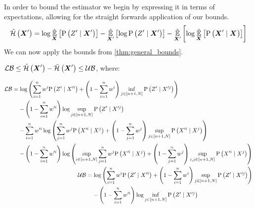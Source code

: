 In order to bound the estimator we begin by expressing it in terms of expectations, allowing for the straight forwards application of our bounds.
\begin{equation}
		\hat{\mathcal{H}}\left({\boldsymbol X_{}^\prime}\right)=\log\operatorname*{\hat{\operatorname*{\mathbb{E}}}}\limits_{\boldsymbol X_{}}\left[{\mathrm{P}\left({Z_{}^\prime}\mid{\ensuremath{\boldsymbol X_{}}^\prime}\right)}\right]-\operatorname*{\hat{\operatorname*{\mathbb{E}}}}\limits_{\boldsymbol X_{}^\prime}\left[{\log\mathrm{P}\left({Z_{}^\prime}\mid{\ensuremath{\boldsymbol X_{}}^\prime}\right)}\right]-\operatorname*{\hat{\operatorname*{\mathbb{E}}}}\limits_{\boldsymbol X_{}^\prime}\left[{\log\operatorname*{\hat{\operatorname*{\mathbb{E}}}}\limits_{\boldsymbol X_{}}\left[{\mathrm{P}\left({\boldsymbol X_{}^\prime}\mid{\ensuremath{\boldsymbol X_{}}}\right)}\right]}\right]
\end{equation}
We can now apply the bounds from \cref{thm:general_bounds}.
\begin{lemma}
	\label{thm:boers_bounds}
	$\operatorname*{\mathcal{LB}}\leq\hat{\mathcal{H}}\left({\boldsymbol X_{}^\prime}\right)-\bar{\mathcal{H}}_{}\left({\boldsymbol X_{}^\prime}\right)\leq\operatorname*{\mathcal{UB}}$, where:
	\begin{small}
	\begin{subequations}
		\begin{align}
			\begin{split}
				\lowerbound &=\log\left(\sum\limits_{i=1}^n\weight{}{i}\probcond{\observations{}^\prime}{\states{}^{\prime i}}+\left(1-\sum\limits_{i=1}^n\weight{}{i}\right)\inf\limits_{j\in[n+1,N]}\probcond{\observations{}^\prime}{\states{}^{\prime j}}\right) \\
				& \phantomeq-\left(1-\sum_{i=1}^n\weight{}{\prime i}\right)\log\sup_{j\in[n+1,N]}\probcond{\observations{}^\prime}{\states{}^{\prime j}}\\
				&\phantomeq-\sum_{i=1}^n\weight{}{\prime i}\log\left(\sum_{j=1}^n\weight{}{j}\probcond{\states{}^{\prime i}}{\states{}^j}+\left(1-\sum\limits_{j=1}^n\weight{}{j}\right)\sup_{j\in[n+1,N]}\probcond{\states{}^{\prime i}}{\states{}^j}\right)\\
				& \phantomeq-\left(1-\sum_{i=1}^n\weight{}{\prime i}\right)\log\left(\sup_{i\in[n+1,N]}\sum_{j=1}^n\weight{}{j}\probcond{\states{}^{\prime i}}{\states{}^j}+\left(1-\sum\limits_{j=1}^n\weight{}{j}\right)\sup_{i,j\in[n+1,N]}\probcond{\states{}^{\prime i}}{\states{}^j}\right)
			\end{split} \\
			\begin{split}
				\upperbound & =\log\left(\sum\limits_{i=1}^n\weight{}{i}\probcond{\observations{}^\prime}{\states{}^{\prime i}}+\left(1-\sum\limits_{i=1}^n\weight{}{i}\right)\sup\limits_{j\in[n+1,N]}\probcond{\observations{}^\prime}{\states{}^{\prime j}}\right) \\
				& \phantomeq-\left(1-\sum_{i=1}^n\weight{}{\prime i}\right)\log\inf_{j\in[n+1,N]}\probcond{\observations{}^\prime}{\states{}^{\prime j}}\\

\end{split}
\end{align}
\end{subequations}
\end{small}
\end{lemma}
